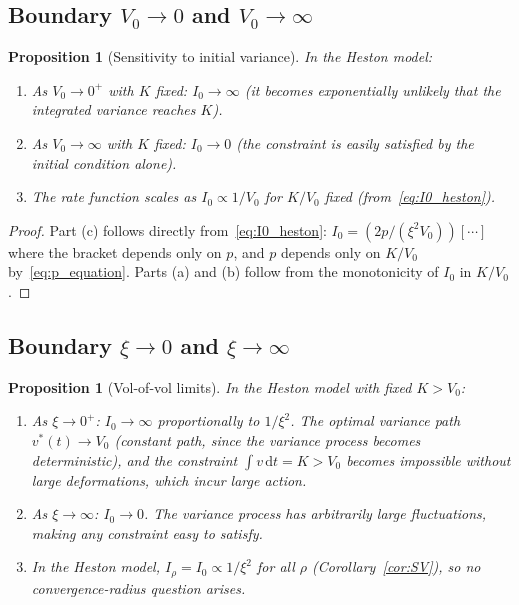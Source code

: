 \documentclass[11pt]{article}
\newtheorem{proposition}[theorem]{Proposition}
\theoremstyle{definition}
\newcommand{\dd}{\mathrm{d}}
\begin{document}
\subsection{Boundary $V_0 \to 0$ and $V_0 \to \infty$}\label{sec:V0_boundary}

\begin{proposition}[Sensitivity to initial variance]\label{prop:V0_limits}
In the Heston model:
\begin{enumerate}[label=(\alph*)]
  \item As $V_0 \to 0^+$ with $K$ fixed: $I_0 \to \infty$ (it becomes exponentially unlikely that the integrated variance reaches $K$).
  \item As $V_0 \to \infty$ with $K$ fixed: $I_0 \to 0$ (the constraint is easily satisfied by the initial condition alone).
  \item The rate function scales as $I_0 \propto 1/V_0$ for $K/V_0$ fixed (from~\eqref{eq:I0_heston}).
\end{enumerate}
\end{proposition}

\begin{proof}
Part (c) follows directly from~\eqref{eq:I0_heston}: $I_0 = (2p/(\xi^2 V_0))[\cdots]$ where the bracket depends only on $p$, and $p$ depends only on $K/V_0$ by~\eqref{eq:p_equation}. Parts (a) and (b) follow from the monotonicity of $I_0$ in $K/V_0$.
\end{proof}

\subsection{Boundary $\xi \to 0$ and $\xi \to \infty$}\label{sec:xi_boundary}

\begin{proposition}[Vol-of-vol limits]\label{prop:xi_limits}
In the Heston model with fixed $K > V_0$:
\begin{enumerate}[label=(\alph*)]
  \item As $\xi \to 0^+$: $I_0 \to \infty$ proportionally to $1/\xi^2$. The optimal variance path $v^*(t) \to V_0$ (constant path, since the variance process becomes deterministic), and the constraint $\int v\,\dd t = K > V_0$ becomes impossible without large deformations, which incur large action.
  \item As $\xi \to \infty$: $I_0 \to 0$. The variance process has arbitrarily large fluctuations, making any constraint easy to satisfy.
  \item In the Heston model, $I_\rho = I_0 \propto 1/\xi^2$ for all $\rho$ (Corollary~\ref{cor:SV}), so no convergence-radius question arises.
\end{enumerate}
\end{proposition}
\end{document}
